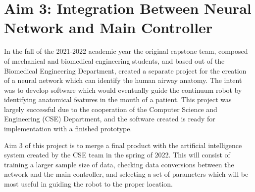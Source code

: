 	\section{Aim 3: Integration Between Neural Network and Main Controller}
	\label{subsect:aim3}
	
	In the fall of the 2021-2022 academic year the original capstone team, composed of mechanical and biomedical engineering students, and based out of the Biomedical Engineering Department, created a separate project for the creation of a neural network which can identify the human airway anatomy. The intent was to develop software which would eventually guide the continuum robot by identifying anatomical features in the mouth of a patient. This project was largely successful due to the cooperation of the Computer Science and Engineering (CSE) Department, and the software created is ready for implementation with a finished prototype.
	
	Aim 3 of this project is to merge a final product with the artificial intelligence system created by the CSE team in the spring of 2022. This will consist of training a larger sample size of data, checking data conversions between the network and the main controller, and selecting a set of parameters which will be most useful in guiding the robot to the proper location.
